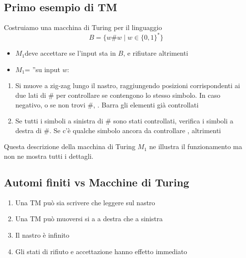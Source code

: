 \subsection{Primo esempio di TM}
Costruiamo una macchina di Turing per il linguaggio 
$$ B = \Big\{ w\# w \mid w\in \{0,1\}^* \Big\}$$
\begin{itemize}
	\item $M_1$deve accettare se l'input sta in $B$, e rifiutare altrimenti
	\item $M_1$= ''su input $w$:
\end{itemize}
\begin{enumerate}
	\item Si muove a zig-zag lungo il nastro, raggiungendo posizioni corrispondenti ai due lati di $\#$ per controllare se contengono lo stesso simbolo. In caso negativo, o se non trovi $\#$, .
		Barra gli elementi già controllati 
	\item Se tutti i simboli a sinistra di $\#$ sono stati controllati, verifica i simboli a destra di $\#$. Se c'è qualche simbolo ancora da controllare , altrimenti  
\end{enumerate}
Questa descrizione della macchina di Turing $M_1$ ne illustra il funzionamento ma non ne mostra tutti i dettagli. 

\subsection{Automi finiti vs Macchine di Turing}
\begin{enumerate}
	\item Una TM può sia scrivere che leggere sul nastro
	\item  Una TM può muoversi si a a destra che a sinistra
	\item  Il nastro è infinito
	\item  Gli stati di rifiuto e accettazione hanno effetto immediato
\end{enumerate}

